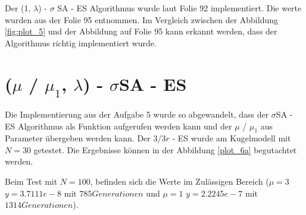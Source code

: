 Der (1, $\lambda$) - $\sigma$ SA - ES Algorithmus wurde laut Folie 92 implementiert. Die werte wurden aus der Folie 95 entnommen. Im Vergleich zwischen der Abbildung \ref{fig:plot_5} und der Abbildung auf Folie 95 kann erkannt werden, dass der Algorithmus richtig implementiert wurde.


\chapter{($\mu$ / $\mu_1$, $\lambda$) - $\sigma$SA - ES}

Die Implementierung aus der Aufgabe 5 wurde so abgewandelt, dass der $\sigma$SA - ES Algorithmus als Funktion aufgerufen werden kann und der $\mu$ / $\mu_1$ aus Parameter übergeben werden kann. Der $3/3r$ - ES wurde am Kugelmodell mit $N = 30$ getestet. Die Ergebnisse können in der Abbildung \ref{plot_6a} begutachtet werden.


Beim Test mit $N = 100$, befinden sich die Werte im Zulässigen Bereich ($ \mu=3$ $y = 3.7111e-8$ mit $785 Generationen$ und $\mu=1$ $y=2.2245e-7$ mit $1314 Generationen$).


